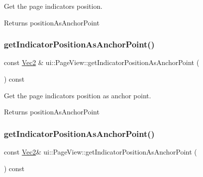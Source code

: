 Get the page indicator\textquotesingle{}s position. 

\begin{DoxyReturn}{Returns}
position\+As\+Anchor\+Point 
\end{DoxyReturn}
\mbox{\label{classui_1_1PageView_afd78e6ec197b8aea68614f9f6c35a70d}} 
\subsubsection{\texorpdfstring{get\+Indicator\+Position\+As\+Anchor\+Point()}{getIndicatorPositionAsAnchorPoint()}\hspace{0.1cm}{\footnotesize\ttfamily [1/2]}}
{\footnotesize\ttfamily const \hyperlink{classVec2}{Vec2} \& ui\+::\+Page\+View\+::get\+Indicator\+Position\+As\+Anchor\+Point (\begin{DoxyParamCaption}{ }\end{DoxyParamCaption}) const}



Get the page indicator\textquotesingle{}s position as anchor point. 

\begin{DoxyReturn}{Returns}
position\+As\+Anchor\+Point 
\end{DoxyReturn}
\mbox{\label{classui_1_1PageView_a285dea7517bb2bd0e4bb0ba7f02c1922}} 
\subsubsection{\texorpdfstring{get\+Indicator\+Position\+As\+Anchor\+Point()}{getIndicatorPositionAsAnchorPoint()}\hspace{0.1cm}{\footnotesize\ttfamily [2/2]}}
{\footnotesize\ttfamily const \hyperlink{classVec2}{Vec2}\& ui\+::\+Page\+View\+::get\+Indicator\+Position\+As\+Anchor\+Point (\begin{DoxyParamCaption}{ }\end{DoxyParamCaption}) const}



